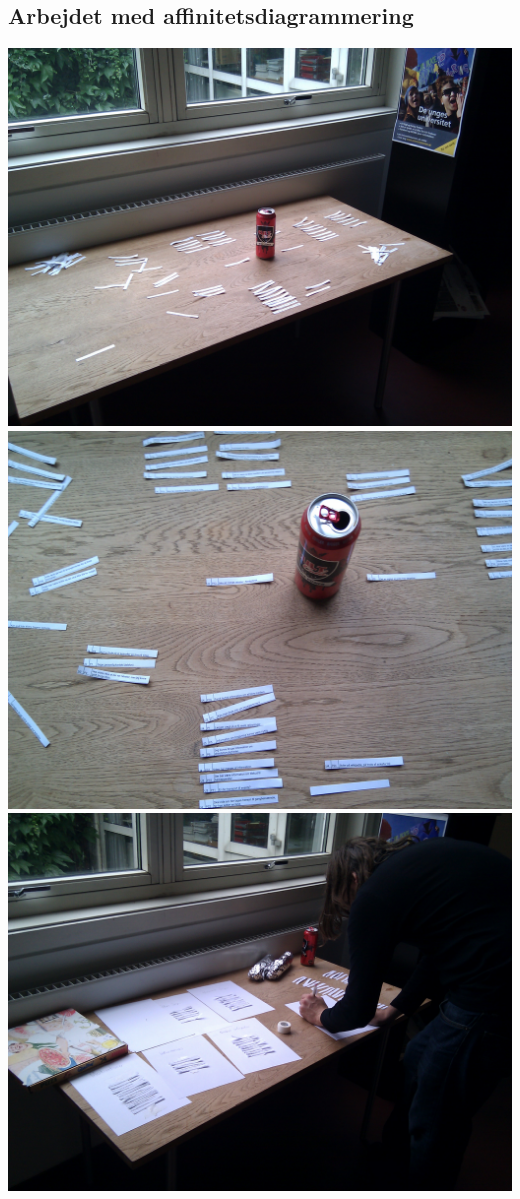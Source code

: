 \begin{appendices}
    \section{Arbejdet med affinitetsdiagrammering}
    \label{b:aff_billeder}
    \includegraphics[scale=0.17]{affinitet/IMG_20100927_145008.jpg}
    \includegraphics[scale=0.17]{affinitet/IMG_20100927_145025.jpg}
    \includegraphics[scale=0.17]{affinitet/IMG_20100927_151239.jpg}

\end{appendices}
